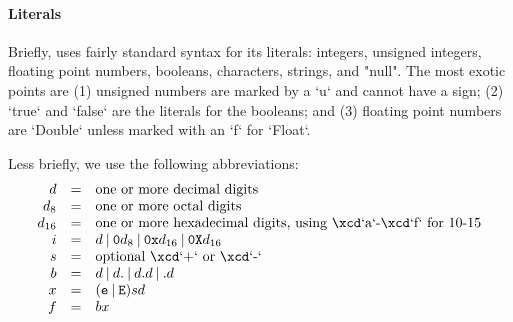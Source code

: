 \paragraph{Literals}\label{Literals}

Briefly, \XtenCurrVer{} uses fairly standard syntax for its literals:
integers, unsigned integers, floating point numbers, booleans, 
characters, strings, and \xcd"null".  The most exotic points are (1) unsigned
numbers are marked by a \xcd`u` and cannot have a sign; (2) \xcd`true` and
\xcd`false` are the literals for the booleans; and (3) floating point numbers
are \xcd`Double` unless marked with an \xcd`f` for \xcd`Float`. 

Less briefly, we use the following abbreviations: 
\begin{displaymath}
\begin{array}{rcll}
d &=& \mbox{one or more decimal digits}\\
d_8 &=& \mbox{one or more octal digits}\\
d_{16} &=& \mbox{one or more hexadecimal digits, using \xcd`a`-\xcd`f`
for 10-15}\\
i &=& d 
        \mathbin{|} {\tt 0} d_8 
        \mathbin{|} {\tt 0x} d_{16}
        \mathbin{|} {\tt 0X} d_{16}
\\
s &=& \mbox{optional \xcd`+` or \xcd`-`}\\
b &=& d 
          \mathbin{|} d {\tt .}
          \mathbin{|} d {\tt .} d
          \mathbin{|}  {\tt .} d \\
x &=& ({\tt e } \mathbin{|} {\tt E})
         s
         d \\
f &=& b x
\end{array}
\end{displaymath}

